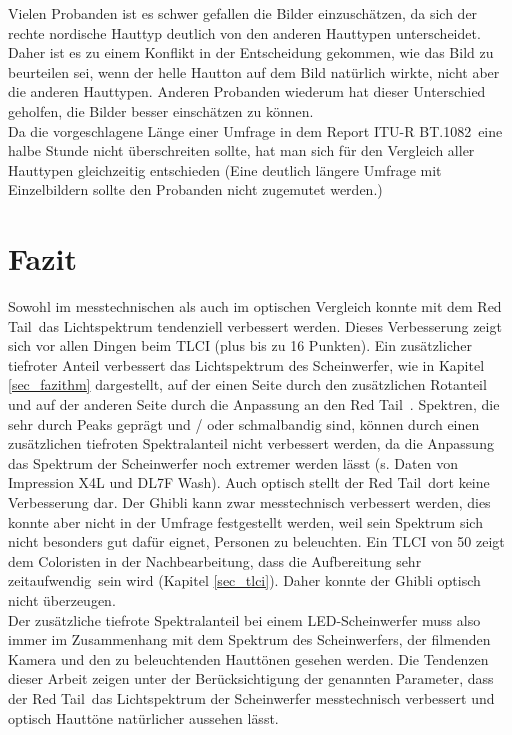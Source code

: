 \newpage
\noindent Vielen Probanden ist es schwer gefallen die Bilder einzuschätzen, da sich der rechte nordische Hauttyp deutlich von den anderen Hauttypen unterscheidet. Daher ist es zu einem Konflikt in der Entscheidung gekommen, wie das Bild zu beurteilen sei, wenn der helle Hautton auf dem Bild natürlich wirkte, nicht aber die anderen Hauttypen. Anderen Probanden wiederum hat dieser Unterschied geholfen, die Bilder besser einschätzen zu können.\\
Da die vorgeschlagene Länge einer Umfrage in dem \glqq Report ITU-R BT.1082\grqq\ eine halbe Stunde nicht überschreiten sollte, hat man sich für den Vergleich aller Hauttypen gleichzeitig entschieden (Eine deutlich längere Umfrage mit Einzelbildern sollte den Probanden nicht zugemutet werden.)



\chapter{Fazit}
Sowohl im messtechnischen als auch im optischen Vergleich konnte mit dem \glqq Red Tail\grqq\ das Lichtspektrum tendenziell verbessert werden. Dieses Verbesserung zeigt sich vor allen Dingen beim TLCI (plus bis zu 16 Punkten). Ein zusätzlicher tiefroter Anteil verbessert das Lichtspektrum des Scheinwerfer, wie in Kapitel \ref{sec_fazithm} dargestellt, auf der einen Seite durch den zusätzlichen Rotanteil und auf der anderen Seite durch die Anpassung an den \glqq Red Tail\grqq\ . Spektren, die sehr durch Peaks geprägt und / oder schmalbandig sind, können durch einen zusätzlichen tiefroten Spektralanteil nicht verbessert werden, da die Anpassung das Spektrum der Scheinwerfer noch extremer werden lässt (s. Daten von Impression X4L und DL7F Wash). Auch optisch stellt der \glqq Red Tail\grqq\ dort keine Verbesserung dar. Der Ghibli kann zwar messtechnisch verbessert werden, dies konnte aber nicht in der Umfrage festgestellt werden, weil sein Spektrum sich nicht besonders gut dafür eignet, Personen zu beleuchten. Ein TLCI von 50 zeigt dem Coloristen in der Nachbearbeitung, dass die \glqq Aufbereitung sehr zeitaufwendig\grqq\ sein wird (Kapitel \ref{sec_tlci}). Daher konnte der Ghibli optisch nicht überzeugen.\\
Der zusätzliche tiefrote Spektralanteil bei einem LED-Scheinwerfer muss also immer im Zusammenhang mit dem Spektrum des Scheinwerfers, der filmenden Kamera und den zu beleuchtenden Hauttönen gesehen werden. Die Tendenzen dieser Arbeit zeigen unter der Berücksichtigung der genannten Parameter, dass der \glqq Red Tail\grqq\ das Lichtspektrum der Scheinwerfer messtechnisch verbessert und optisch Hauttöne natürlicher aussehen lässt.

